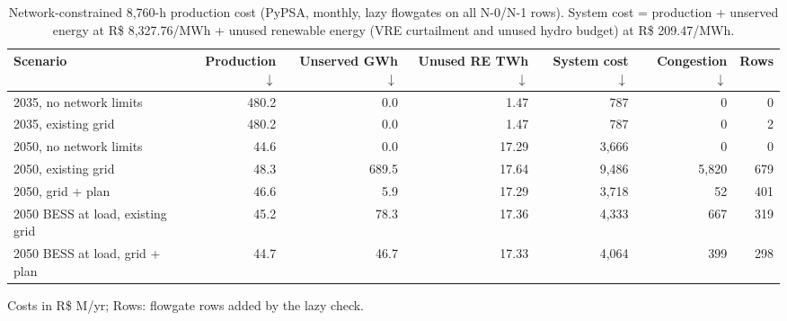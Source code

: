 \begin{table}[!htbp]
\centering
\footnotesize
\caption{Network-constrained 8,760-h production cost (PyPSA, monthly, lazy flowgates on all N-0/N-1 rows). System cost = production + unserved energy at R\$ 8,327.76/MWh + unused renewable energy (VRE curtailment and unused hydro budget) at R\$ 209.47/MWh.}
\label{tab:pcm}
\begin{adjustbox}{max width=\linewidth}
\begin{tabular}{lrrrrrr}
\toprule
Scenario & Production $\downarrow$ & Unserved GWh $\downarrow$ & Unused RE TWh $\downarrow$ & System cost $\downarrow$ & Congestion $\downarrow$ & Rows \\
\midrule
2035, no network limits & 480.2 & 0.0 & 1.47 & 787 & 0 & 0 \\
2035, existing grid & 480.2 & 0.0 & 1.47 & 787 & 0 & 2 \\
2050, no network limits & 44.6 & 0.0 & 17.29 & 3,666 & 0 & 0 \\
2050, existing grid & 48.3 & 689.5 & 17.64 & 9,486 & 5,820 & 679 \\
2050, grid + plan & 46.6 & 5.9 & 17.29 & 3,718 & 52 & 401 \\
2050 BESS at load, existing grid & 45.2 & 78.3 & 17.36 & 4,333 & 667 & 319 \\
2050 BESS at load, grid + plan & 44.7 & 46.7 & 17.33 & 4,064 & 399 & 298 \\
\bottomrule
\end{tabular}
\end{adjustbox}
\par\vspace{2pt}\begin{minipage}{0.95\linewidth}\footnotesize Costs in R\$ M/yr; Rows: flowgate rows added by the lazy check.\end{minipage}
\end{table}
